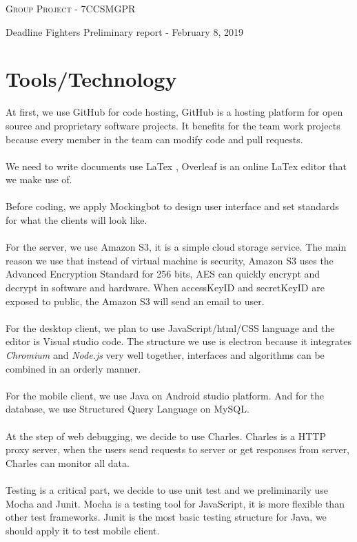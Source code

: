 \documentclass[10.25pt,a4paper,oneside]{article}
\begin{document}
{
\begin{center}
	\textsc{Group Project - 7CCSMGPR}
\end{center}
\begin{center}
	\hspace{0.5cm} Deadline Fighters \hspace{0.5 cm} Preliminary report - February 8, 2019
\end{center}

\section{Tools/Technology}
At first, we use GitHub for code hosting, GitHub is a hosting platform for open source and proprietary software projects. It benefits for the team work projects because every member in the team can modify code and pull requests.\\\\
We need to write documents use LaTex , Overleaf is an online LaTex editor that we make use of.\\\\
Before coding, we apply Mockingbot to design user interface and set standards for what the clients will look like.\\\\
For the server, we use Amazon S3, it is a simple cloud storage service. The main reason we use that instead of virtual machine is security, Amazon S3 uses the Advanced Encryption Standard for 256 bits, AES can quickly encrypt and decrypt in software and hardware. When accessKeyID and secretKeyID are exposed to public, the Amazon S3 will send an email to user.\\\\
For the desktop client, we plan to use JavaScript/html/CSS language and the editor is Visual studio code. The structure we use is electron because it integrates \emph{Chromium} and \emph{Node.js} very well together, interfaces and algorithms can be combined in an orderly manner.\\\\
For the mobile client, we use Java on Android studio platform. And for the database, we use Structured Query Language on MySQL.\\\\
At the step of web debugging, we decide to use Charles. Charles is a HTTP proxy server, when the users send requests to server or get responses from server, Charles can monitor all data.\\\\
Testing is a critical part, we decide to use unit test and we preliminarily use Mocha and Junit. Mocha is a testing tool for JavaScript, it is more flexible than other test frameworks. Junit is the most basic testing structure for Java, we should apply it to test mobile client.


}
\end{document}
